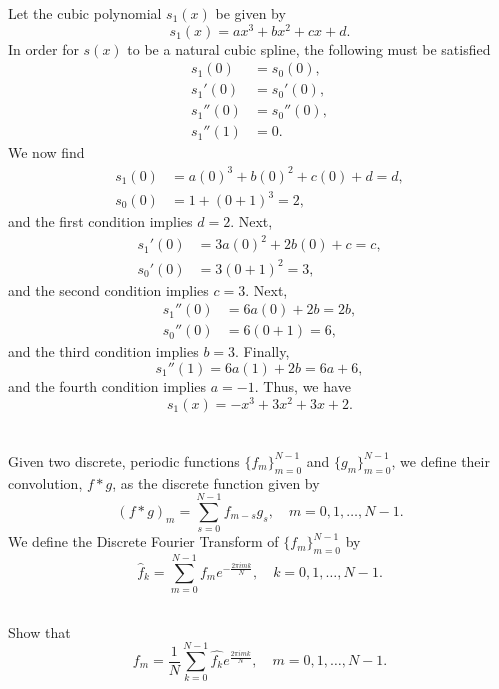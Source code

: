 \documentclass[12pt]{article}
\newenvironment{problem}
    {\begin{lrbox}{\mybox}\begin{minipage}{0.98\textwidth}}
    {\end{minipage}\end{lrbox}\framebox[\textwidth]{\usebox{\mybox}}}
\newcommand{\<}{\left\langle}
\renewcommand{\>}{\right\rangle}
\begin{document}
Let the cubic polynomial $s_1(x)$ be given by
\[
    s_1(x) = ax^3 + bx^2 + cx + d.
\]
In order for $s(x)$ to be a natural cubic spline, the following must be satisfied
\begin{align*}
    s_1(0) &= s_0(0), \\
    s_1'(0) &= s_0'(0), \\
    s_1''(0) &= s_0''(0), \\
    s_1''(1) &= 0.
\end{align*}
We now find
\begin{align*}
    s_1(0) &= a(0)^3 + b(0)^2 + c(0) + d = d, \\
    s_0(0) &= 1 + (0 + 1)^3 = 2,
\end{align*}
and the first condition implies $d = 2$. Next,
\begin{align*}
    s_1'(0) &= 3a(0)^2 + 2b(0) + c = c, \\
    s_0'(0) &= 3(0 + 1)^2 = 3,
\end{align*}
and the second condition implies $c = 3$. Next,
\begin{align*}
    s_1''(0) &= 6a(0) + 2b = 2b, \\
    s_0''(0) &= 6(0 + 1) = 6,
\end{align*}
and the third condition implies $b = 3$. Finally,
\[
    s_1''(1) = 6a(1) + 2b = 6a + 6,
\]
and the fourth condition implies $a = -1$. Thus, we have
\[
    s_1(x) = -x^3 + 3x^2 + 3x + 2.
\]


\section{}
\begin{problem}
    Given two discrete, periodic functions $\{f_m\}_{m=0}^{N-1}$ and $\{g_m\}_{m=0}^{N-1}$, we define their convolution, $f * g$, as the discrete function given by
    \[
        (f * g)_m = \sum_{s=0}^{N-1} f_{m-s} g_s, \quad m = 0, 1, \dots, N-1.
    \]
    We define the Discrete Fourier Transform of $\{f_m\}_{m=0}^{N-1}$ by
    \[
        \widehat{f}_k = \sum_{m=0}^{N-1} f_m e^{- \frac{2 \pi i mk}{N}}, \quad k = 0, 1, \dots, N-1.
    \]
\end{problem}

\subsection{}
\begin{problem}
    Show that
    \[
        f_m = \frac1N \sum_{k=0}^{N-1} \widehat{f_k} e^{\frac{2 \pi i mk}{N}}, \quad m = 0, 1, \dots, N-1.
    \]
\end{problem}
\end{document}
